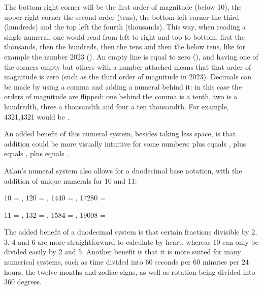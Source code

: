 The bottom right corner will be the first order of magnitude (below 10), the upper-right corner the second order (tens), the bottom-left corner the third (hundreds) and the top left the fourth (thousands). This way, when reading a single numeral, one would read from left to right and top to bottom, first the thousands, then the hundreds, then the tens and then the below tens, like for example the number 2023 (). An empty line is equal to zero (), and having one of the corners empty but others with a number attached means that that order of magnitude is zero (such as the third order of magnitude in 2023). Decimals can be made by using a comma and adding a numeral behind it: in this case the orders of magnitude are flipped: one behind the comma is a tenth, two is a hundredth, three a thousandth and four a ten thousandth. For example, 4321,4321 would be \comma{}. 

An added benefit of this numeral system, besides taking less space, is that addition could be more visually intuitive for some numbers:  plus  equals ,  plus  equals ,  plus  equals . 

Atlan’s numeral system also allows for a duodecimal base notation, with the addition of unique numerals for 10 and 11: 

\vspace{0.2cm}
{\small
10 = , 120 = , 1440 = , 17280 =  

11 = , 132 = , 1584 = , 19008 =  
}
\vspace{0.2cm}

The added benefit of a duodecimal system is that certain fractions divisible by 2, 3, 4 and 6 are more straightforward to calculate by heart, whereas 10 can only be divided easily by 2 and 5. Another benefit is that it is more suited for many numerical systems, such as time divided into 60 seconds per 60 minutes per 24 hours, the twelve months and zodiac signs, as well as rotation being divided into 360 degrees.  

